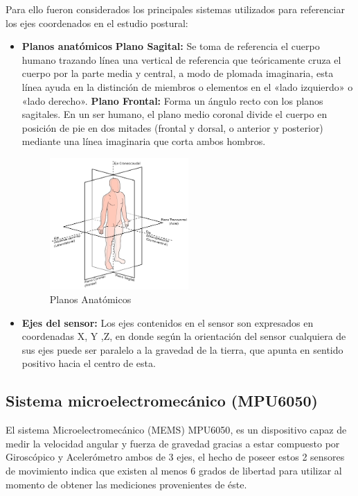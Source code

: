 \documentclass[12pt,a4paper]{article}
\begin{document}
Para ello fueron considerados los principales sistemas utilizados para referenciar los ejes coordenados en el estudio postural:
\begin{itemize}
	
	\item \textbf{Planos anatómicos} 
		\subitem \textbf{Plano Sagital:}
		 Se toma de referencia el cuerpo humano trazando línea una  vertical de referencia que teóricamente cruza el cuerpo por la parte media y central, a modo de plomada imaginaria, esta línea ayuda en la distinción de miembros o elementos en el «lado izquierdo» o «lado derecho».
		 \subitem \textbf{Plano Frontal:} Forma un ángulo recto con los planos sagitales. En un ser humano, el plano medio coronal divide el cuerpo en posición de pie en dos mitades (frontal y dorsal, o anterior y posterior) mediante una línea imaginaria que corta ambos hombros.

	\begin{figure}[H]
		\centering
		\includegraphics[width=0.5\textwidth]{images/planosAnatomicos}
		\caption{Planos Anatómicos}
		\label{fig:sagital}
	\end{figure}

	\item \textbf{Ejes del sensor:} Los ejes contenidos en el sensor son expresados en coordenadas X, Y ,Z, en donde según la orientación del sensor cualquiera de sus ejes puede ser paralelo a la gravedad de la tierra, que apunta en sentido positivo hacia el centro de esta.
\end{itemize}

\newpage

\subsection{Sistema microelectromecánico (MPU6050)}
El sistema Microelectromecánico (MEMS) MPU6050\cite{MPU6050}, es un dispositivo capaz de medir la velocidad angular y fuerza de gravedad gracias a estar compuesto por Giroscópico y Acelerómetro ambos de 3 ejes, el hecho de poseer estos 2 sensores de movimiento indica que existen al menos 6 grados de libertad para utilizar al momento de obtener las mediciones provenientes de éste.
\end{document}
